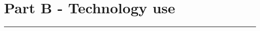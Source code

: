 \section*{Part B - Technology use}

\noindent \begin{center}
\rule[0.5ex]{1\linewidth}{1pt}
\par\end{center}

\begin{comment}
    Despite security risks, 75\% of CEOs use applications that aren't approved by IT [1]
    
Managing technology in an organisation can be a challenge at the best of times. This problem increases
as an organisation grows, and along with the what is often referred to as 'shadow IT'. One are in particular
is the integration and adoption of new technologies by the higher echelons in an organisation. Typically
this is done without formal approval or integration with organisational IT, with the inherent authority
being used to justify this. This was seen clearly with the mass adoption of the various Apple computing
devices. This is despite Apple ( unlike the Blackberry platform) not having any kind of enterprise
integration. Your task is to address how this can be managed in an organisation, and in particular what
the resultant risks could be and how they could in turn be mitigated. You should state any assumptions,
and provide suitable context to the case study you are using. Expected length 6-8 pages. (30)

[1] \url{http://www.techrepublic.com/article/%2520despite-security-risks-75-of-ceos-use-applications-that-arent-approved-by-it/}
\end{comment}
